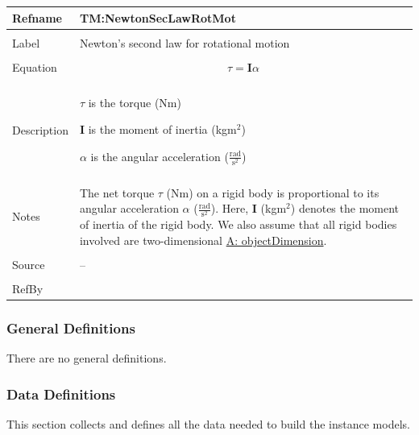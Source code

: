 \documentclass[12pt]{article}
\begin{document}
\noindent \begin{minipage}{\textwidth}
\begin{tabular}{>{\raggedright}p{}>{\raggedright\arraybackslash}p{}}
\toprule \textbf{Refname} & \textbf{TM:NewtonSecLawRotMot}
\label{TM:NewtonSecLawRotMot}
\\ \midrule \\
Label & Newton's second law for rotational motion
\\ \midrule \\
Equation & \begin{displaymath}
           τ=\mathbf{I} α
           \end{displaymath}
\\ \midrule \\
Description & \begin{symbDescription}
              \item{$τ$ is the torque (Nm)}
              \item{$\mathbf{I}$ is the moment of inertia (kg$\text{m}^{2}$)}
              \item{$α$ is the angular acceleration ($\frac{\text{rad}}{\text{s}^{2}}$)}
              \end{symbDescription}
\\ \midrule \\
Notes & The net torque $τ$ (Nm) on a rigid body is proportional to its angular acceleration $α$ ($\frac{\text{rad}}{\text{s}^{2}}$). Here, $\mathbf{I}$ (kg$\text{m}^{2}$) denotes the moment of inertia of the rigid body. We also assume that all rigid bodies involved are two-dimensional \hyperref[assumpOD]{A: objectDimension}.
\\ \midrule \\
Source & --
\\ \midrule \\
RefBy & 
\\ \bottomrule
\end{tabular}
\end{minipage}
\subsubsection{General Definitions}
\label{Sec:GDs}
There are no general definitions.
\subsubsection{Data Definitions}
\label{Sec:DDs}
This section collects and defines all the data needed to build the instance models.
\par~
\end{document}

